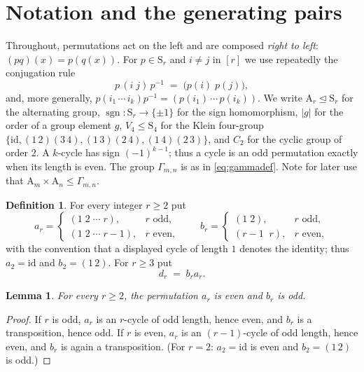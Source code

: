 \documentclass[11pt]{article}
\theoremstyle{plain}
\newtheorem{lemma}[theorem]{Lemma}
\theoremstyle{definition}
\newtheorem{definition}[theorem]{Definition}
\theoremstyle{remark}
\numberwithin{equation}{section}
\newcommand{\Sym}{\mathrm{S}}
\newcommand{\Alt}{\mathrm{A}}
\newcommand{\Gam}{\Gamma}
\DeclareMathOperator{\sgn}{sgn}
\newcommand{\normal}{\trianglelefteq}
\begin{document}
\section{Notation and the generating pairs}
\label{sec:gens}

Throughout, permutations act on the left and are composed \emph{right to left}: $(pq)(x) =
p(q(x))$. For $p \in \Sym_r$ and $i \ne j$ in $[r]$ we use repeatedly the conjugation rule
\begin{equation}
\label{eq:conj}
p\,(i\;j)\,p^{-1} \;=\; \bigl(p(i)\;p(j)\bigr),
\end{equation}
and, more generally, $p (i_1\,\cdots\,i_k) p^{-1} = (p(i_1)\,\cdots\,p(i_k))$. We write
$\Alt_r \normal \Sym_r$ for the alternating group, $\sgn : \Sym_r \to \{\pm1\}$ for the sign
homomorphism, $|g|$ for the order of a group element $g$, $V_4 \le \Sym_4$ for the Klein
four-group $\{\mathrm{id},(1\,2)(3\,4),(1\,3)(2\,4),(1\,4)(2\,3)\}$, and $C_2$ for the cyclic
group of order $2$. A $k$-cycle has sign $(-1)^{k-1}$; thus a cycle is an odd permutation
exactly when its length is even. The group $\Gam_{m,n}$ is as in \eqref{eq:gammadef}. Note for
later use that $\Alt_m \times \Alt_n \le \Gam_{m,n}$.

\begin{definition}
\label{def:ab}
For every integer $r \ge 2$ put
\begin{equation}
\label{eq:abdef}
a_r =
\begin{cases}
(1\;2\;\cdots\;r), & r \text{ odd},\\[2pt]
(1\;2\;\cdots\;r-1), & r \text{ even},
\end{cases}
\qquad
b_r =
\begin{cases}
(1\;2), & r \text{ odd},\\[2pt]
(r-1\;\;r), & r \text{ even},
\end{cases}
\end{equation}
with the convention that a displayed cycle of length $1$ denotes the identity; thus
$a_2 = \mathrm{id}$ and $b_2 = (1\,2)$. For $r \ge 3$ put
\begin{equation}
\label{eq:ddef}
d_r \;=\; b_r a_r .
\end{equation}
\end{definition}

\begin{lemma}
\label{lem:parity}
For every $r \ge 2$, the permutation $a_r$ is even and $b_r$ is odd.
\end{lemma}

\begin{proof}
If $r$ is odd, $a_r$ is an $r$-cycle of odd length, hence even, and $b_r$ is a transposition,
hence odd. If $r$ is even, $a_r$ is an $(r-1)$-cycle of odd length, hence even, and $b_r$ is
again a transposition. (For $r = 2$: $a_2 = \mathrm{id}$ is even and $b_2 = (1\,2)$ is odd.)
\end{proof}
\end{document}

